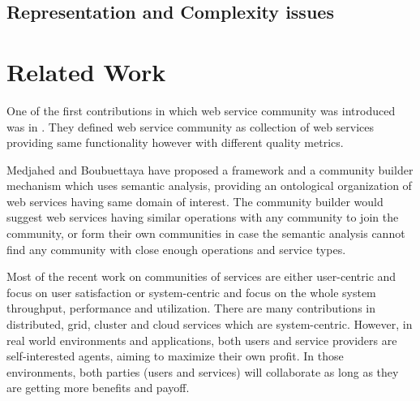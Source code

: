         \subsection{Representation and Complexity issues}\label{sec:CWSArchitecture}

    \section{Related Work}\label{sec:BRRelatedWork}

        One of the first contributions in which web service community was introduced was in \cite{Zeng:2003:QDW:775152.775211}. They defined web service community as collection of web services providing same functionality however with different quality metrics.

        Medjahed and Boubuettaya \cite{journals/dpd/MedjahedB05} have proposed a framework and a community builder mechanism which uses semantic analysis, providing an ontological organization of web services having same domain of interest. The community builder would suggest web services having similar operations with any community to join the community, or form their own communities in case the semantic analysis cannot find any community with close enough operations and service types.

        Most of the recent work on communities of services are either
        user-centric and focus on user satisfaction
        \cite{Chun02user-centricperformance} or system-centric and focus
        on the whole system throughput, performance and utilization. There
        are many contributions in distributed, grid, cluster and cloud
        services which are system-centric. However, in real world
        environments and applications, both users and service providers
        are self-interested agents, aiming to maximize their own profit.
        In those environments, both parties (users and services) will
        collaborate as long as they are getting more benefits and payoff.

